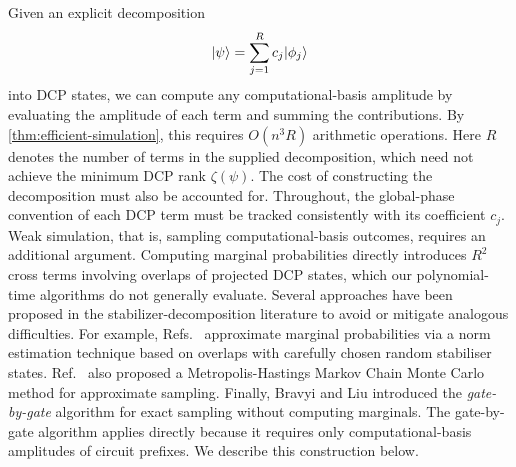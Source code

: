 Given an explicit decomposition
\begin{align}
    |\psi\rangle=\sum_{j=1}^{R}c_j|\phi_j\rangle
\end{align}
into DCP states, we can compute any computational-basis amplitude by evaluating the amplitude of each term and summing the contributions.
By \cref{thm:efficient-simulation}, this requires $O(n^3R)$ arithmetic operations.
Here $R$ denotes the number of terms in the supplied decomposition, which need not achieve the minimum DCP rank $\zeta(\psi)$.
The cost of constructing the decomposition must also be accounted for.
Throughout, the global-phase convention of each DCP term must be tracked consistently with its coefficient $c_j$.
Weak simulation, that is, sampling computational-basis outcomes, requires an additional argument.
Computing marginal probabilities directly introduces $R^2$ cross terms involving overlaps of projected DCP states, which our polynomial-time algorithms do not generally evaluate.
Several approaches have been proposed in the stabilizer-decomposition literature to avoid or mitigate analogous difficulties.
For example, Refs.~\cite{bravyi2016improved, bravyi2019simulation} approximate marginal probabilities via a norm estimation technique based on overlaps with carefully chosen random stabiliser states.
Ref.~\cite{bravyi2019simulation} also proposed a Metropolis-Hastings Markov Chain Monte Carlo method for approximate sampling.
Finally, Bravyi and Liu \cite{bravyi2022how} introduced the \emph{gate-by-gate} algorithm for exact sampling without computing marginals.
The gate-by-gate algorithm applies directly because it requires only computational-basis amplitudes of circuit prefixes.
We describe this construction below.


